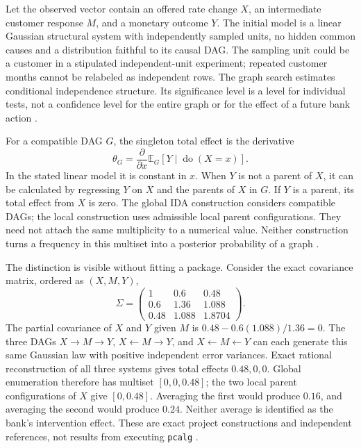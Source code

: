 Let the observed vector contain an offered rate change \(X\), an
intermediate customer response \(M\), and a monetary outcome \(Y\). The
initial model is a linear Gaussian structural system with independently
sampled units, no hidden common causes and a distribution faithful to
its causal DAG. The sampling unit could be a customer in a stipulated
independent-unit experiment; repeated customer months cannot be
relabeled as independent rows. The graph search estimates conditional
independence structure. Its significance level is a level for individual
tests, not a confidence level for the entire graph or for the effect of
a future bank action \citep{exec13_pcalg}.

For a compatible DAG \(G\), the singleton total effect is the derivative
\[
 \theta_G=\frac{\partial}{\partial x}
     \mathbb E_G[Y\mid\operatorname{do}(X=x)].
\] In the stated linear model it is constant in \(x\). When \(Y\) is not
a parent of \(X\), it can be calculated by regressing \(Y\) on \(X\) and
the parents of \(X\) in \(G\). If \(Y\) is a parent, its total effect
from \(X\) is zero. The global IDA construction considers compatible
DAGs; the local construction uses admissible local parent
configurations. They need not attach the same multiplicity to a
numerical value. Neither construction turns a frequency in this multiset
into a posterior probability of a graph
\citep{exec13_pcalg,exec13_pcalg_reuse_primary}.

The distinction is visible without fitting a package. Consider the exact
covariance matrix, ordered as \((X,M,Y)\), \[
 \Sigma=\begin{pmatrix}
  1&0.6&0.48\\
  0.6&1.36&1.088\\
  0.48&1.088&1.8704
 \end{pmatrix}.
\] The partial covariance of \(X\) and \(Y\) given \(M\) is
\(0.48-0.6(1.088)/1.36=0\). The three DAGs \(X\to M\to Y\),
\(X\leftarrow M\to Y\), and \(X\leftarrow M\leftarrow Y\) can each
generate this same Gaussian law with positive independent error
variances. Exact rational reconstruction of all three systems gives
total effects \(0.48,0,0\). Global enumeration therefore has multiset
\([0,0,0.48]\); the two local parent configurations of \(X\) give
\([0,0.48]\). Averaging the first would produce \(0.16\), and averaging
the second would produce \(0.24\). Neither average is identified as the
bank's intervention effect. These are exact project constructions and
independent references, not results from executing \texttt{pcalg}
\citep{exec13_pcalg_reuse_examples}.


